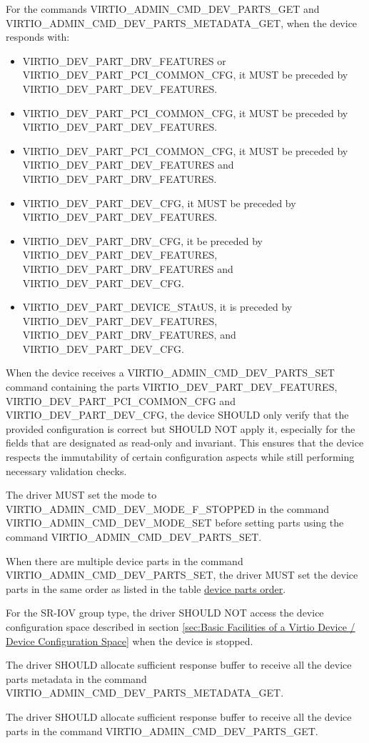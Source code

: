 For the commands VIRTIO_ADMIN_CMD_DEV_PARTS_GET and
VIRTIO_ADMIN_CMD_DEV_PARTS_METADATA_GET, when the device responds with:
\begin{itemize}
\item
VIRTIO_DEV_PART_DRV_FEATURES or VIRTIO_DEV_PART_PCI_COMMON_CFG, it MUST be
preceded by VIRTIO_DEV_PART_DEV_FEATURES.

\item VIRTIO_DEV_PART_PCI_COMMON_CFG, it MUST be preceded by
VIRTIO_DEV_PART_DEV_FEATURES.

\item VIRTIO_DEV_PART_PCI_COMMON_CFG, it MUST be preceded by
VIRTIO_DEV_PART_DEV_FEATURES and VIRTIO_DEV_PART_DRV_FEATURES.

\item VIRTIO_DEV_PART_DEV_CFG, it MUST be preceded by VIRTIO_DEV_PART_DEV_FEATURES.

\item VIRTIO_DEV_PART_DRV_CFG, it be preceded by VIRTIO_DEV_PART_DEV_FEATURES,
VIRTIO_DEV_PART_DRV_FEATURES and VIRTIO_DEV_PART_DEV_CFG.

\item VIRTIO_DEV_PART_DEVICE_STAtUS, it is preceded by VIRTIO_DEV_PART_DEV_FEATURES,
VIRTIO_DEV_PART_DRV_FEATURES, and VIRTIO_DEV_PART_DEV_CFG.
\end{itemize}

When the device receives a VIRTIO_ADMIN_CMD_DEV_PARTS_SET command containing the
parts VIRTIO_DEV_PART_DEV_FEATURES, VIRTIO_DEV_PART_PCI_COMMON_CFG and
VIRTIO_DEV_PART_DEV_CFG, the device SHOULD only verify that the provided configuration is
correct but SHOULD NOT apply it, especially for the fields that are designated
as read-only and invariant. This ensures that the device respects the
immutability of certain configuration aspects while still performing necessary
validation checks.


The driver MUST set the mode to VIRTIO_ADMIN_CMD_DEV_MODE_F_STOPPED in
the command VIRTIO_ADMIN_CMD_DEV_MODE_SET before setting parts using the command
VIRTIO_ADMIN_CMD_DEV_PARTS_SET.

When there are multiple device parts in the command
VIRTIO_ADMIN_CMD_DEV_PARTS_SET, the driver MUST set the device parts in the same
order as listed in the table
\hyperref[table:Basic Facilities of a Virtio Device / Device groups / Group administration commands / Device parts / Device parts order/ Device parts order]{device parts order}.

For the SR-IOV group type, the driver SHOULD NOT access the device configuration
space described in section
\ref{sec:Basic Facilities of a Virtio Device / Device Configuration Space}
when the device is stopped.

The driver SHOULD allocate sufficient response buffer to receive all the device
parts metadata in the command VIRTIO_ADMIN_CMD_DEV_PARTS_METADATA_GET.

The driver SHOULD allocate sufficient response buffer to receive all the device
parts in the command VIRTIO_ADMIN_CMD_DEV_PARTS_GET.
